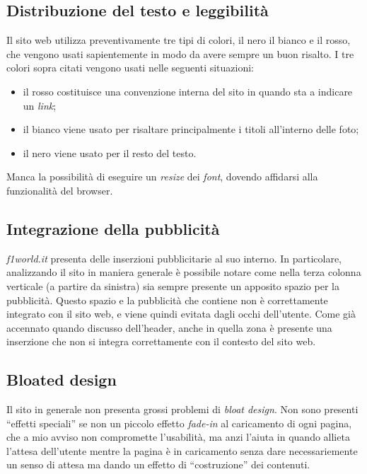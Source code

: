 \subsection{Distribuzione del testo e leggibilità}
Il sito web utilizza preventivamente tre tipi di colori, il nero il bianco e il
rosso, che vengono usati sapientemente in modo da avere sempre un buon risalto.
I tre colori sopra citati vengono usati nelle seguenti situazioni:
\begin{itemize}

  \item il rosso costituisce una convenzione interna del sito in
  quando sta a indicare un \textit{link};

  \item il bianco viene usato per risaltare principalmente i titoli
  all'interno delle foto;

  \item il nero viene usato per il resto del testo.

\end{itemize}
Manca la possibilità di eseguire un \textit{resize} dei \textit{font}, dovendo
affidarsi alla funzionalità del browser.

\subsection{Integrazione della pubblicità}
\textit{f1world.it} presenta delle inserzioni pubblicitarie al suo interno.
In particolare, analizzando il sito in maniera generale è possibile notare come
nella terza colonna verticale (a partire da sinistra) sia sempre presente un
apposito spazio per la pubblicità. Questo spazio e la pubblicità che contiene
non è correttamente integrato con il sito web, e viene quindi evitata dagli
occhi dell'utente.
Come già accennato quando discusso dell'header, anche in quella zona è presente
una inserzione che non si integra correttamente con il contesto del sito web.

\subsection{Bloated design}
Il sito in generale non presenta grossi problemi di \textit{bloat design}.
Non sono presenti ``effetti speciali'' se non un piccolo effetto
\textit{fade-in} al caricamento di ogni pagina, che a mio avviso non compromette
l'usabilità, ma anzi l'aiuta in quando allieta l'attesa dell'utente mentre la
pagina è in caricamento senza dare necessariemente un senso di attesa ma dando
un effetto di ``costruzione'' dei contenuti.
